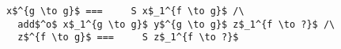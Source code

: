 \begin{figure}[!t]
  \centering
  \begin{minipage}{\columnwidth}
    \begin{lstlisting}[frame=tb]
  x$^{g \to g}$ ===     S x$_1^{f \to g}$ /\
  add$^o$ x$_1^{g \to g}$ y$^{g \to g}$ z$_1^{f \to ?}$ /\
  z$^{f \to g}$ ===     S z$_1^{f \to ?}$
    \end{lstlisting}
  \end{minipage}
\end{figure}